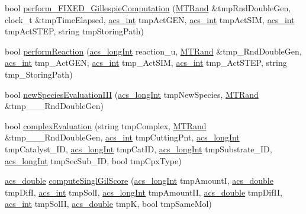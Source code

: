 \begin{DoxyCompactItemize}
\item 
bool \hyperlink{a00014_aa4fba7d5679a16fd6ef1a9a2041779a2}{perform\-\_\-\-F\-I\-X\-E\-D\-\_\-\-Gillespie\-Computation} (\hyperlink{a00016}{M\-T\-Rand} \&tmp\-Rnd\-Double\-Gen, clock\-\_\-t \&tmp\-Time\-Elapsed, \hyperlink{a00050_a8d277355641a098190360234e2ebde35}{acs\-\_\-int} tmp\-Act\-G\-E\-N, \hyperlink{a00050_a8d277355641a098190360234e2ebde35}{acs\-\_\-int} tmp\-Act\-S\-I\-M, \hyperlink{a00050_a8d277355641a098190360234e2ebde35}{acs\-\_\-int} tmp\-Act\-S\-T\-E\-P, string tmp\-Storing\-Path)
\item 
bool \hyperlink{a00014_a1db4e67ba458a54f4fab3e10a203765c}{perform\-Reaction} (\hyperlink{a00050_a19319d75f02db4308bc5c0026d98cd85}{acs\-\_\-long\-Int} reaction\-\_\-u, \hyperlink{a00016}{M\-T\-Rand} \&tmp\-\_\-\-Rnd\-Double\-Gen, \hyperlink{a00050_a8d277355641a098190360234e2ebde35}{acs\-\_\-int} tmp\-\_\-\-Act\-G\-E\-N, \hyperlink{a00050_a8d277355641a098190360234e2ebde35}{acs\-\_\-int} tmp\-\_\-\-Act\-S\-I\-M, \hyperlink{a00050_a8d277355641a098190360234e2ebde35}{acs\-\_\-int} tmp\-\_\-\-Act\-S\-T\-E\-P, string tmp\-\_\-\-Storing\-Path)
\item 
bool \hyperlink{a00014_a4fe7891fb38f3f25bb82769af0ddfe19}{new\-Species\-Evaluation\-I\-I\-I} (\hyperlink{a00050_a19319d75f02db4308bc5c0026d98cd85}{acs\-\_\-long\-Int} tmp\-New\-Species, \hyperlink{a00016}{M\-T\-Rand} \&tmp\-\_\-\-\_\-\-\_\-\-Rnd\-Double\-Gen)
\item 
bool \hyperlink{a00014_a5ee6b203f077de1467aa72042814db7d}{complex\-Evaluation} (string tmp\-Complex, \hyperlink{a00016}{M\-T\-Rand} \&tmp\-\_\-\-\_\-\-\_\-\-Rnd\-Double\-Gen, \hyperlink{a00050_a8d277355641a098190360234e2ebde35}{acs\-\_\-int} tmp\-Cutting\-Pnt, \hyperlink{a00050_a19319d75f02db4308bc5c0026d98cd85}{acs\-\_\-long\-Int} tmp\-Catalyst\-\_\-\-I\-D, \hyperlink{a00050_a19319d75f02db4308bc5c0026d98cd85}{acs\-\_\-long\-Int} tmp\-Cat\-I\-D, \hyperlink{a00050_a19319d75f02db4308bc5c0026d98cd85}{acs\-\_\-long\-Int} tmp\-Substrate\-\_\-\-I\-D, \hyperlink{a00050_a19319d75f02db4308bc5c0026d98cd85}{acs\-\_\-long\-Int} tmp\-Sec\-Sub\-\_\-\-I\-D, bool tmp\-Cpx\-Type)
\item 
\hyperlink{a00050_ab776853a005fcbf56af0424a2a4dd607}{acs\-\_\-double} \hyperlink{a00014_ae1270b9c235dd6b28413075197dba8e0}{compute\-Singl\-Gil\-Score} (\hyperlink{a00050_a19319d75f02db4308bc5c0026d98cd85}{acs\-\_\-long\-Int} tmp\-Amount\-I, \hyperlink{a00050_ab776853a005fcbf56af0424a2a4dd607}{acs\-\_\-double} tmp\-Dif\-I, \hyperlink{a00050_a8d277355641a098190360234e2ebde35}{acs\-\_\-int} tmp\-Sol\-I, \hyperlink{a00050_a19319d75f02db4308bc5c0026d98cd85}{acs\-\_\-long\-Int} tmp\-Amount\-I\-I, \hyperlink{a00050_ab776853a005fcbf56af0424a2a4dd607}{acs\-\_\-double} tmp\-Dif\-I\-I, \hyperlink{a00050_a8d277355641a098190360234e2ebde35}{acs\-\_\-int} tmp\-Sol\-I\-I, \hyperlink{a00050_ab776853a005fcbf56af0424a2a4dd607}{acs\-\_\-double} tmp\-K, bool tmp\-Same\-Mol)

\end{DoxyCompactItemize}

